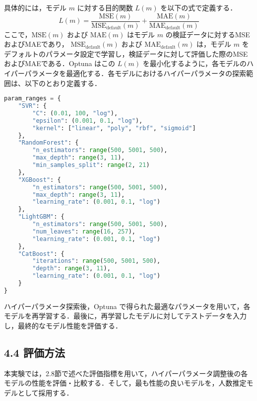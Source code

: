 具体的には，モデル \( m \) に対する目的関数 \( L(m) \) を以下の式で定義する．
\begin{equation}
L(m) = \frac{\mathrm{MSE}(m)}{\mathrm{MSE}_{\mathrm{default}}(m)} + \frac{\mathrm{MAE}(m)}{\mathrm{MAE}_{\mathrm{default}}(m)}
\end{equation}
ここで，\( \mathrm{MSE}(m) \) および \( \mathrm{MAE}(m) \) はモデル \( m \) の検証データに対するMSEおよびMAEであり，  
\( \mathrm{MSE}_{\mathrm{default}}(m) \) および \( \mathrm{MAE}_{\mathrm{default}}(m) \) は，モデル \( m \) をデフォルトのパラメータ設定で学習し，検証データに対して評価した際のMSEおよびMAEである．Optuna はこの \( L(m) \) を最小化するように，各モデルのハイパーパラメータを最適化する．各モデルにおけるハイパーパラメータの探索範囲は、以下のとおり定義する．
\begin{lstlisting}[style=mystyle, language=Python, caption=各モデルのハイパーパラメータ探索範囲]
param_ranges = {
    "SVR": {
        "C": (0.01, 100, "log"),
        "epsilon": (0.001, 0.1, "log"),
        "kernel": ["linear", "poly", "rbf", "sigmoid"]
    },
    "RandomForest": {
        "n_estimators": range(500, 5001, 500),
        "max_depth": range(3, 11),
        "min_samples_split": range(2, 21)
    },
    "XGBoost": {
        "n_estimators": range(500, 5001, 500),
        "max_depth": range(3, 11),
        "learning_rate": (0.001, 0.1, "log")
    },
    "LightGBM": {
        "n_estimators": range(500, 5001, 500),
        "num_leaves": range(16, 257),
        "learning_rate": (0.001, 0.1, "log")
    },
    "CatBoost": {
        "iterations": range(500, 5001, 500),
        "depth": range(3, 11),
        "learning_rate": (0.001, 0.1, "log")
    }
}
\end{lstlisting}
ハイパーパラメータ探索後，Optuna で得られた最適なパラメータを用いて，各モデルを再学習する．最後に，再学習したモデルに対してテストデータを入力し，最終的なモデル性能を評価する．

\subsection*{4.4 評価方法}
本実験では，2.8節で述べた評価指標を用いて，ハイパーパラメータ調整後の各モデルの性能を評価・比較する．そして，最も性能の良いモデルを，人数推定モデルとして採用する．

